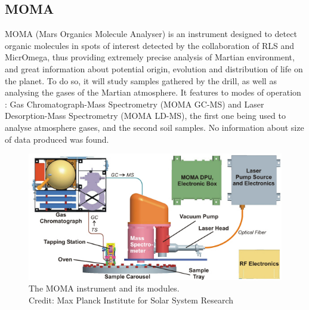 \documentclass[12pt,a4paper]{article}
\begin{document}
\subsection{MOMA}
MOMA (Mars Organics Molecule Analyser) is an instrument designed to detect organic molecules in spots of interest detected by the collaboration of RLS and MicrOmega, thus providing extremely precise analysis of Martian environment, and great information about potential origin, evolution and distribution of life on the planet. To do so, it will study samples gathered by the drill, as well as analysing the gases of the Martian atmosphere. It features to modes of operation : Gas Chromatograph-Mass Spectrometry (MOMA GC-MS) and Laser Desorption-Mass Spectrometry (MOMA LD-MS), the first one being used to analyse atmosphere gases, and the second soil samples. No information about size of data produced was found.

\begin{figure}[h]
\centering
\includegraphics[scale=.7]{pictures/MOMA.jpg}
\caption{The MOMA instrument and its modules.\\Credit: Max Planck Institute for Solar System Research}
\end{figure}

\pagebreak
\end{document}
